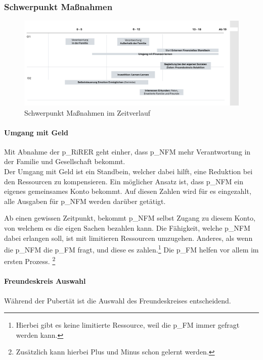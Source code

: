 \subsubsection{Schwerpunkt Maßnahmen}

\begin{figure}[H]
	\centering
	\includegraphics[scale = 0.3]{attachment/chapter_OWN/Scc008.png}
	\caption{Schwerpunkt Maßnahmen im Zeitverlauf}
\end{figure}

\paragraph{Umgang mit Geld}
Mit Abnahme der \gls{p_RiRER} geht einher, dass \gls{p_NFM} mehr Verantwortung in der Familie und Gesellschaft bekommt.\\

Der Umgang mit Geld ist ein Standbein, welcher dabei hilft, eine Reduktion bei den Ressourcen zu kompensieren. Ein möglicher Ansatz ist, dass \gls{p_NFM} ein eigenes gemeinsames Konto bekommt. Auf diesen Zahlen wird für es eingezahlt, alle Ausgaben für \gls{p_NFM} werden darüber getätigt.

Ab einen gewissen Zeitpunkt, bekommt \gls{p_NFM} selbst Zugang zu diesem Konto, von welchem es die eigen Sachen bezahlen kann. Die Fähigkeit, welche \gls{p_NFM} dabei erlangen soll, ist mit limitieren Ressourcen umzugehen. Anderes, als wenn die \gls{p_NFM} die \gls{p_FM} fragt, und diese es zahlen.\footnote{
	Hierbei gibt es keine limitierte Ressource, weil die \gls{p_FM} immer gefragt werden kann.
} Die \gls{p_FM} helfen vor allem im ersten Prozess. \footnote{
	Zusätzlich kann hierbei Plus und Minus schon gelernt werden.
}

\paragraph{Freundeskreis Auswahl}

Während der Pubertät ist die Auswahl des Freundeskreises entscheidend.\\

